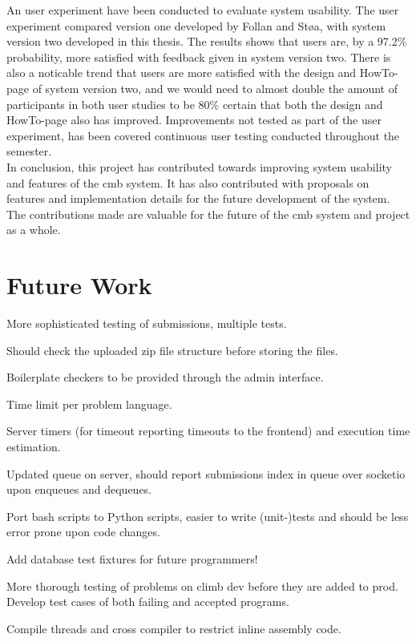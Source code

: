 An user experiment have been conducted to evaluate system usability. The user experiment compared version one developed by Follan and Støa, with system version two developed in this thesis. The results shows that users are, by a 97.2\% probability, more satisfied with feedback given in system version two. There is also a noticable trend that users are more satisfied with the design and HowTo-page of system version two, and we would need to almost double the amount of participants in both user studies to be 80\% certain that both the design and HowTo-page also has improved. Improvements not tested as part of the user experiment, has been covered continuous user testing conducted throughout the semester. \\

In conclusion, this project has contributed towards improving system usability and features of the \gls{cmb} system. It has also contributed with proposals on features and implementation details for the future development of the system. The contributions made are valuable for the future of the \gls{cmb} system and project as a whole.


\section{Future Work}
\label{sec:future-work}

More sophisticated testing of submissions, multiple tests.

Should check the uploaded zip file structure before storing the files.

Boilerplate checkers to be provided through the admin interface.

Time limit per problem language.

Server timers (for timeout reporting timeouts to the frontend) and execution time estimation.

Updated queue on server, should report submissions index in queue over socketio upon enqueues and dequeues.

Port bash scripts to Python scripts, easier to write (unit-)tests and should be less error prone upon code changes.

Add database test fixtures for future programmers!

More thorough testing of problems on climb dev before they are added to prod. Develop test cases of both failing and accepted programs.

Compile threads and cross compiler to restrict inline assembly code.
